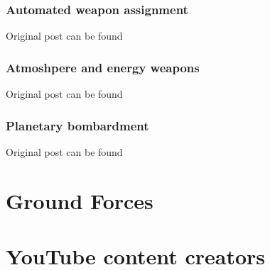 \documentclass[10pt,a4paper,oneside]{article}
\begin{document}
\section{Automated weapon assignment}
Original post can be found

\section{Atmoshpere and energy weapons}
Original post can be found

\section{Planetary bombardment}
Original post can be found


\newpage
\part{Ground Forces}


\newpage
\part{YouTube content creators}

\end{document}
